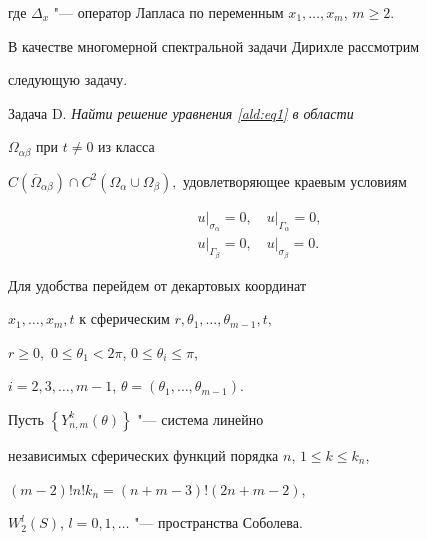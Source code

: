 где $\Delta_{x}$ "--- оператор Лапласа по переменным $x_{1} ,\dots, x_{m}$, $m \ge 2.$



В качестве многомерной спектральной задачи Дирихле рассмотрим

следующую задачу.



\bigskip



\hypertarget{ald:taskD}{}



{\small\sc Задача D.} \em Найти решение уравнения \eqref{ald:eq1}  в области

$\Omega_{\alpha\beta}$ при $t\neq0$ из класса

$C(\overline{\Omega}_{\alpha\beta}) \cap C^2 (\Omega_\alpha\cup

\Omega_\beta),$ удовлетворяющее краевым условиям

\begin{gather}

  u\big|_{\sigma_\alpha} = 0,\quad

  u\big|_{\Gamma_\alpha}= 0,

\label{ald:eq2}

\\

\label{ald:eq3}

u\big|_{\Gamma_\beta}= 0,\quad  u\big|_{\sigma_\beta} = 0. 

\end{gather}



\em



\bigskip



Для  удобства перейдем от декартовых координат

$x_1,\dots,x_m,t$ к сферичес\-ким $r, \theta_1,\dots,\theta_{m-1},t, $ 

$r\ge 0,$  $ 0\le \theta_1 < 2\pi$, $0 \le \theta_i \leq \pi$, 

$i= 2,3,\dots,m-1$, $\theta=(\theta_1,\dots,\theta_{m-1}).$



Пусть $\left\{ {Y_{n,m}^{k}(\theta )}\right\} $ "--- система линейно

независимых сферических функций порядка $n$, $1 \le k \le k_{n}$,

$(m - 2)!n!k_{n} = (n + m - 3)!(2n + m - 2)$,

$W_{2}^{l}(S)$, $l = 0,1,\dots $ "--- пространства Соболева.



